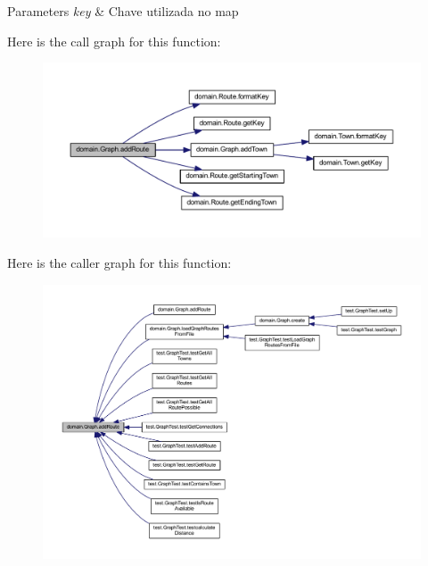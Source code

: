 \begin{DoxyParams}{Parameters}
{\em key} & Chave utilizada no map \\
\hline
\end{DoxyParams}
Here is the call graph for this function\+:\nopagebreak
\begin{figure}[H]
\begin{center}
\leavevmode
\includegraphics[width=350pt]{classdomain_1_1_graph_a2ecd9722f3cbb7d97fda519101d249ed_cgraph}
\end{center}
\end{figure}
Here is the caller graph for this function\+:\nopagebreak
\begin{figure}[H]
\begin{center}
\leavevmode
\includegraphics[width=350pt]{classdomain_1_1_graph_a2ecd9722f3cbb7d97fda519101d249ed_icgraph}
\end{center}
\end{figure}
\mbox{\label{classdomain_1_1_graph_a356a31b6dba042cccb2a743caa07bfdf}} 
